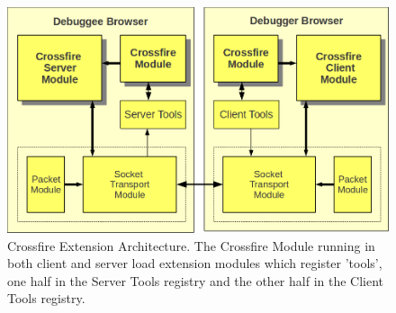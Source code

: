 \begin{figure}[htp]
  \includegraphics  [width = 86 mm] {figures/crossfire-arch4}
  \caption{Crossfire Extension Architecture. The Crossfire Module running in both client and server
load extension modules which register 'tools', one half in the Server Tools registry and the other half in the Client Tools registry. }
 \label{fig:crossfire-arch}
\end{figure}
